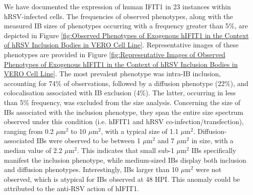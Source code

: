 We have documented the expression of human IFIT1 in 23 instances within hRSV-infected cells. The frequencies of observed phenotypes, along with the measured IB sizes of phenotypes occurring with a frequency greater than 5\%, are depicted in Figure \ref{fig:Observed Phenotypes of Exogenous hIFIT1 in the Context of hRSV Inclusion Bodies in VERO Cell Line}. Representative images of these phenotypes are provided in Figure \ref{fig:Representative Images of Observed Phenotypes of Exogenous hIFIT1 in the Context of hRSV Inclusion Bodies in VERO Cell Line}. The most prevalent phenotype was intra-IB inclusion, accounting for 74\% of observations, followed by a diffusion phenotype (22\%), and colocalisation associated with IB exclusion (4\%). The latter, occurring in less than 5\% frequency, was excluded from the size analysis. Concerning the size of IBs associated with the inclusion phenotype, they span the entire size spectrum observed under this condition (i.e. hIFIT1 and hRSV co-infection/transfection), ranging from 0.2 \(\mu \mbox{m}^2\) to 10 \(\mu \mbox{m}^2\), with a typical size of 1.1 \(\mu \mbox{m}^2\). Diffusion-associated IBs were observed to be between 1 \(\mu \mbox{m}^2\) and 7 \(\mu \mbox{m}^2\) in size, with a median value of 2.2 \(\mu \mbox{m}^2\). This indicates that small sub-1 \(\mu \mbox{m}^2\) IBs specifically manifest the inclusion phenotype, while medium-sized IBs display both inclusion and diffusion phenotypes. Interestingly, IBs larger than 10 \(\mu \mbox{m}^2\) were not observed, which is atypical for IBs observed at 48 HPI. This anomaly could be attributed to the anti-RSV action of hIFIT1.

